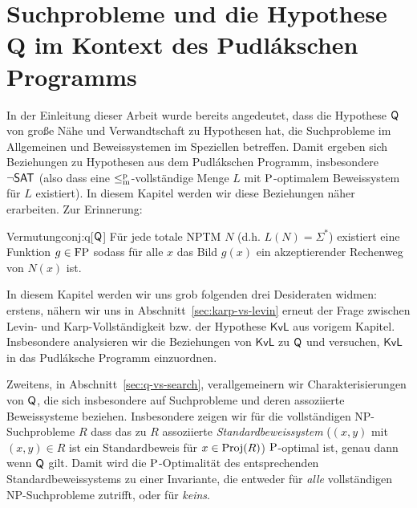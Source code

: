 \chapter{Suchprobleme und die Hypothese Q im Kontext des Pudlákschen Programms}\label{chap:pudlak}


In der Einleitung dieser Arbeit wurde bereits angedeutet, dass die Hypothese $\hQ$ von \citeauthor{fenner_inverting_2003} große Nähe und Verwandtschaft zu Hypothesen hat, die Suchprobleme im Allgemeinen und Beweissystemen im Speziellen betreffen. Damit ergeben sich Beziehungen zu Hypothesen aus dem Pudlákschen Programm, insbesondere $\neg\hSAT$ (also dass eine $\leqmp$-vollständige Menge $L$ mit $\P$-optimalem Beweissystem für $L$ existiert).
In diesem Kapitel werden wir diese Beziehungen näher erarbeiten. Zur Erinnerung:

\begin{reptheorem}{Vermutung}{conj:q}[$\hQ$]
    Für jede totale NPTM $N$ (d.h. $L(N)=\Sigma^*$) existiert eine Funktion $g\in\FP$ sodass für alle $x$ das Bild $g(x)$ ein akzeptierender Rechenweg von $N(x)$ ist. 
\end{reptheorem}


In diesem Kapitel werden wir uns grob folgenden drei Desideraten widmen: 
erstens, nähern wir uns in Abschnitt~\ref{sec:karp-vs-levin} erneut der Frage zwischen Levin- und Karp-Vollständigkeit bzw. der Hypothese $\mathsf{KvL}$ aus vorigem Kapitel. Insbesondere analysieren wir die Beziehungen von $\mathsf{KvL}$ zu $\hQ$ und versuchen, $\mathsf{KvL}$ in das Pudláksche Programm einzuordnen.

Zweitens, in Abschnitt~\ref{sec:q-vs-search}, verallgemeinern wir Charakterisierungen von $\hQ$, die sich insbesondere auf Suchprobleme und deren assoziierte Beweissysteme beziehen.
Insbesondere zeigen wir für die vollständigen NP-Suchprobleme $R$ dass das zu $R$ assoziierte \emph{Standardbeweissystem} ($(x,y)$ mit $(x,y)\in R$ ist ein Standardbeweis für $x\in\Proj(R)$) $\P$-optimal ist, genau dann wenn $\hQ$ gilt. Damit wird die $\P$-Optimalität des entsprechenden Standardbeweissystems zu einer Invariante, die entweder für \emph{alle} vollständigen NP-Suchprobleme zutrifft, oder für \emph{keins}.


